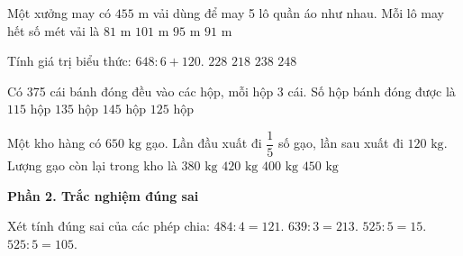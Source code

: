\begin{ex} %
Một xưởng may có $455\text{ m}$ vải dùng để may 5 lô quần áo như nhau. Mỗi lô may hết số mét vải là
\choice
{$81\text{ m}$}
{$101\text{ m}$}
{$95\text{ m}$}
{\True $91\text{ m}$}
\end{ex}

\begin{ex} %
Tính giá trị biểu thức: $648 : 6 + 120$.
\choice
{\True $228$}
{$218$}
{$238$}
{$248$}
\end{ex}

\begin{ex} %
Có 375 cái bánh đóng đều vào các hộp, mỗi hộp 3 cái. Số hộp bánh đóng được là
\choice
{$115$ hộp}
{$135$ hộp}
{$145$ hộp}
{\True $125$ hộp}
\end{ex}

\begin{ex} %
Một kho hàng có $650\text{ kg}$ gạo. Lần đầu xuất đi $\dfrac{1}{5}$ số gạo, lần sau xuất đi $120\text{ kg}$. Lượng gạo còn lại trong kho là
\choice
{$380\text{ kg}$}
{$420\text{ kg}$}
{\True $400\text{ kg}$}
{$450\text{ kg}$}
\end{ex}

\textbf{Phần 2. Trắc nghiệm đúng sai}

\begin{ex} %
Xét tính đúng sai của các phép chia:
\choiceTF
{\True $484 : 4 = 121$.}
{\True $639 : 3 = 213$.}
{$525 : 5 = 15$.}
{\True $525 : 5 = 105$.}
\end{ex}

